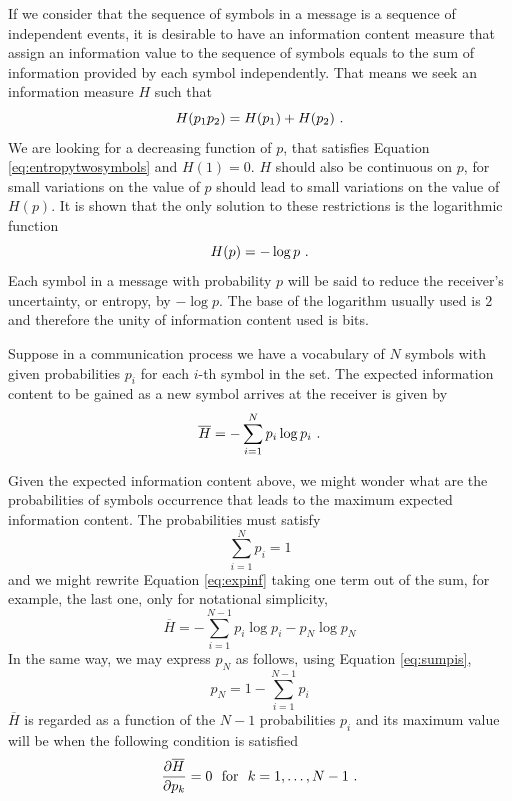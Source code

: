 If we consider that the sequence of symbols in a message is a sequence of independent
events, it is desirable to have an information content measure that assign an information
value to the sequence of symbols equals to the sum of information provided by each
symbol independently. That means we seek an information measure $H$ such that
\begin{equation}
\label{eq:entropytwosymbols}
H(p_1 p_2) = H(p_1) + H(p_2) \textmd{ .}
\end{equation} 
We are looking for a decreasing function of $p$, that satisfies Equation 
\ref{eq:entropytwosymbols} and $H(1) = 0$. $H$ should also be continuous on $p$,
for small variations on the value of $p$ should lead to small variations on the 
value of $H(p)$. It is shown \citep{shannon1948} that the only solution to these restrictions is the
logarithmic function
\begin{equation}
H(p) = - \log p \textmd{ .}
\end{equation} 
Each symbol in a message with probability $p$ will be said to reduce the
receiver's uncertainty, or entropy, by $-\log p$. The base of the logarithm 
usually used is $2$ and therefore the unity of information content used is bits.

Suppose in a communication process we have a vocabulary of $N$ symbols
with given probabilities $p_i$ for each $i$-th symbol in the set.
The expected information content to be gained as a new symbol arrives
at the receiver is given by
\begin{equation}
\label{eq:expinf}
\overline{H} = - \sum_{i=1}^{N} p_i \log p_i \textmd{ .}
\end{equation}

Given the expected information content above, we might wonder what are the
probabilities of symbols occurrence that leads to the maximum expected information
content. The probabilities must satisfy 
\begin{equation}
\label{eq:sumpis}
\sum_{i=1}^N p_i = 1
\end{equation}  
and we might rewrite Equation \ref{eq:expinf} taking one term out of the sum,
for example, the last one, only for notational simplicity,
\begin{equation}
\label{eq:entmn}
\overline{H} = - \sum_{i=1}^{N-1} p_i \log p_i - p_N \log p_N
\end{equation}
In the same way, we may express $p_N$ as follows, using Equation \ref{eq:sumpis},
\begin{equation}
\label{eq:pNsumps}
p_N = 1 - \sum_{i=1}^{N-1} p_i
\end{equation}
$\overline{H}$ is regarded as a function of the $N-1$ probabilities $p_i$
and its maximum value will be when the following condition is satisfied
\begin{equation}
\label{eq:condmaxent}
\frac{\partial \overline{H}}{ \partial p_k } = 0 \textmd{ \ for \ } k = 1, \ldots, N-1 \textmd{ .}
\end{equation}

